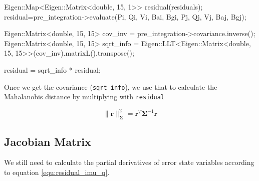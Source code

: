 \documentclass[12pt]{report}   %
\begin{document}
\begin{cppcode}
Eigen::Map<Eigen::Matrix<double, 15, 1>> residual(residuals);
residual=pre_integration->evaluate(Pi, Qi, Vi, Bai, Bgi, Pj, Qj, Vj, Baj, Bgj);

Eigen::Matrix<double, 15, 15> cov_inv = pre_integration->covariance.inverse();
Eigen::Matrix<double, 15, 15> sqrt_info =
Eigen::LLT<Eigen::Matrix<double, 15, 15>>(cov_inv).matrixL().transpose();

residual = sqrt_info * residual; 
\end{cppcode}

Once we get the covariance (\verb|sqrt_info|), we use that to calculate the Mahalanobis distance by multiplying with \verb|residual|

\begin{equation}
\|\mathbf{r}\|^2_{\boldsymbol{\Sigma}} = \mathbf{r}^T \boldsymbol{\Sigma}^{-1} \mathbf{r}
\end{equation}

\subsection{Jacobian Matrix}

We still need to calculate the partial derivatives of error state variables according to equation \eqref{equ:residual_imu_q}.
\end{document}
